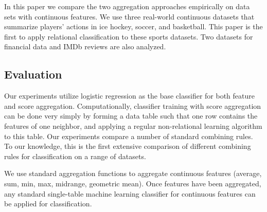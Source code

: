 \documentclass[conference]{IEEEtran}
\begin{document}
%
In this paper we compare the two aggregation approaches empirically on data sets with continuous features. We  use three real-world continuous datasets that summarize players' actions in ice hockey, soccer, and basketball. This paper is the first to apply relational classification to these sports datasets.
Two datasets for financial data and IMDb reviews are also analyzed.


\subsection{Evaluation}
Our experiments utilize logistic regression as the base classifier for both feature and score aggregation.
Computationally, classifier training with score aggregation can be done very simply by forming a data table such that one row contains the features of one neighbor, and applying a regular non-relational learning algorithm to this table. Our experiments compare a number of standard combining rules. To our knowledge, this is the first extensive comparison of different combining rules for classification on a range of datasets.

We use standard aggregation functions to aggregate continuous features (average, sum, min, max, midrange, geometric mean). Once features have been aggregated, any standard single-table machine learning classifier for continuous features can be applied for classification.


\end{document}
